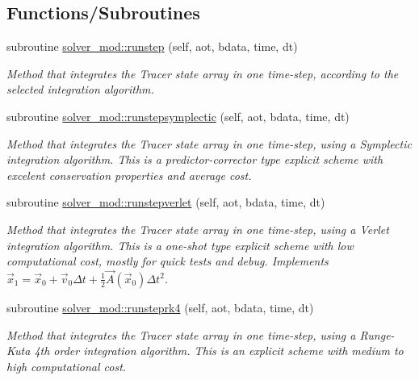 \subsection*{Functions/\+Subroutines}
\begin{DoxyCompactItemize}
\item 
subroutine \mbox{\hyperlink{namespacesolver__mod_ab87d71c6c8aa1709901ec14f9bf12505}{solver\+\_\+mod\+::runstep}} (self, aot, bdata, time, dt)
\begin{DoxyCompactList}\small\item\em Method that integrates the Tracer state array in one time-\/step, according to the selected integration algorithm. \end{DoxyCompactList}\item 
subroutine \mbox{\hyperlink{namespacesolver__mod_a91ddfd70d0f6d65b00fe6b08f4113cd6}{solver\+\_\+mod\+::runstepsymplectic}} (self, aot, bdata, time, dt)
\begin{DoxyCompactList}\small\item\em Method that integrates the Tracer state array in one time-\/step, using a Symplectic integration algorithm. This is a predictor-\/corrector type explicit scheme with excelent conservation properties and average cost. \end{DoxyCompactList}\item 
subroutine \mbox{\hyperlink{namespacesolver__mod_acf893016edd8e0eb4bc77666aed1096f}{solver\+\_\+mod\+::runstepverlet}} (self, aot, bdata, time, dt)
\begin{DoxyCompactList}\small\item\em Method that integrates the Tracer state array in one time-\/step, using a Verlet integration algorithm. This is a one-\/shot type explicit scheme with low computational cost, mostly for quick tests and debug. Implements $ {\vec {x}}_{1}={\vec {x}}_{0}+{\vec {v}}_{0}\Delta t+{\frac {1}{2}}{\vec {A}}({\vec {x}}_{0})\Delta t^{2}$. \end{DoxyCompactList}\item 
subroutine \mbox{\hyperlink{namespacesolver__mod_ae59da54f053ae369d76f130b3790f3b7}{solver\+\_\+mod\+::runsteprk4}} (self, aot, bdata, time, dt)
\begin{DoxyCompactList}\small\item\em Method that integrates the Tracer state array in one time-\/step, using a Runge-\/\+Kuta 4th order integration algorithm. This is an explicit scheme with medium to high computational cost. \end{DoxyCompactList}\item 

\end{DoxyCompactItemize}
